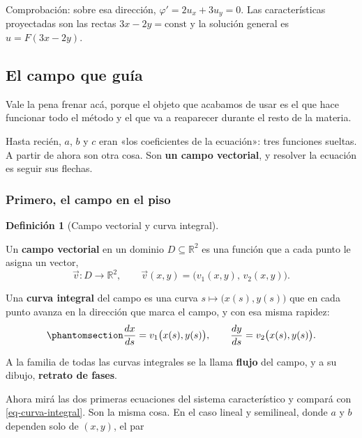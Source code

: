 \documentclass[
  spanish,
  a4paper,
]{scrbook}
\theoremstyle{definition}
\newtheorem{definition}{Definición}[chapter]
\theoremstyle{plain}
\theoremstyle{definition}
\theoremstyle{plain}
\theoremstyle{definition}
\theoremstyle{remark}
\begin{document}
Comprobación: sobre esa dirección, \(\varphi' = 2u_x + 3u_y = 0\). Las
características proyectadas son las rectas \(3x - 2y = \text{const}\) y
la solución general es \(u = F(3x-2y)\).

\subsection{El campo que guía}\label{sec-campo-guia}

Vale la pena frenar acá, porque el objeto que acabamos de usar es el que
hace funcionar todo el método y el que va a reaparecer durante el resto
de la materia.

Hasta recién, \(a\), \(b\) y \(c\) eran «los coeficientes de la
ecuación»: tres funciones sueltas. A partir de ahora son otra cosa. Son
\textbf{un campo vectorial}, y resolver la ecuación es seguir sus
flechas.

\subsubsection{Primero, el campo en el piso}\label{sec-campo-piso}

\begin{definition}[Campo vectorial y curva
integral]\protect\hypertarget{def-campo-integral}{}\label{def-campo-integral}

Un \textbf{campo vectorial} en un dominio \(D \subseteq \mathbb{R}^2\)
es una función que a cada punto le asigna un vector, \[
\vec v : D \to \mathbb{R}^2, \qquad \vec v(x,y) = \big(v_1(x,y),\, v_2(x,y)\big) .
\]

Una \textbf{curva integral} del campo es una curva
\(s \mapsto \big(x(s), y(s)\big)\) que en cada punto avanza en la
dirección que marca el campo, y con esa misma rapidez:
\begin{equation}\protect\phantomsection\label{eq-curva-integral}{
\frac{dx}{ds} = v_1\big(x(s), y(s)\big), \qquad
\frac{dy}{ds} = v_2\big(x(s), y(s)\big) .
}\end{equation}

A la familia de todas las curvas integrales se la llama \textbf{flujo}
del campo, y a su dibujo, \textbf{retrato de fases}.

\end{definition}

Ahora mirá las dos primeras ecuaciones del sistema característico y
compará con \ref{eq-curva-integral}. Son la misma cosa. En el caso
lineal y semilineal, donde \(a\) y \(b\) dependen solo de \((x,y)\), el
par
\end{document}

